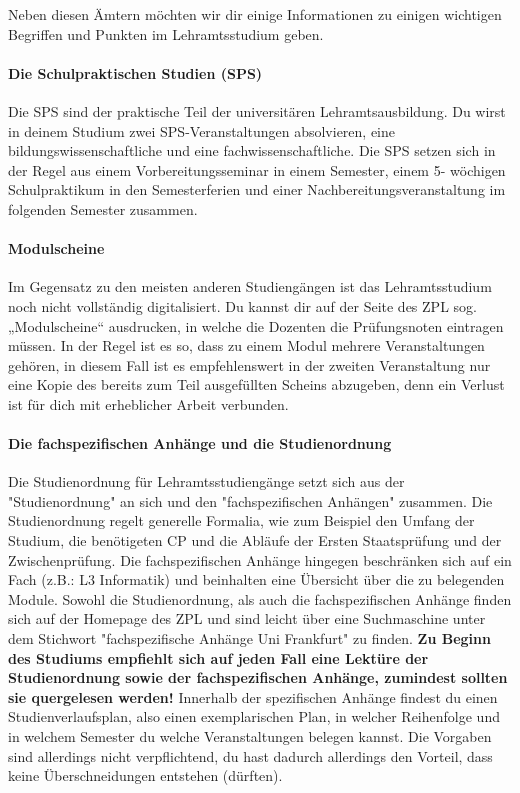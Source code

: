 Neben diesen Ämtern möchten wir dir einige Informationen zu einigen wichtigen Begriffen und Punkten im Lehramtsstudium geben.

\paragraph{Die Schulpraktischen Studien (SPS)}
Die SPS sind der praktische Teil der universitären Lehramtsausbildung. Du wirst in deinem Studium zwei SPS-Veranstaltungen absolvieren, eine bildungswissenschaftliche und eine fachwissenschaftliche. Die SPS setzen sich in der Regel aus einem Vorbereitungsseminar in einem Semester, einem 5- wöchigen Schulpraktikum in den Semesterferien und einer Nachbereitungsveranstaltung im folgenden Semester zusammen.

\paragraph{Modulscheine}
Im Gegensatz zu den meisten anderen Studiengängen ist das Lehramtsstudium noch nicht vollständig digitalisiert. Du kannst dir auf der Seite des ZPL sog. „Modulscheine“ ausdrucken, in welche die Dozenten die Prüfungsnoten eintragen müssen.
In der Regel ist es so, dass zu einem Modul mehrere Veranstaltungen gehören, in diesem Fall ist es empfehlenswert in der zweiten Veranstaltung nur eine Kopie des bereits zum Teil ausgefüllten Scheins abzugeben, denn ein Verlust ist für dich mit erheblicher Arbeit verbunden.

\paragraph{Die fachspezifischen Anhänge und die Studienordnung}
Die Studienordnung für Lehramtsstudiengänge setzt sich aus der
"Studienordnung" an sich und den "fachspezifischen Anhängen" zusammen. Die Studienordnung regelt generelle Formalia, wie zum Beispiel den Umfang der Studium, die benötigeten CP und die Abläufe der Ersten Staatsprüfung und der Zwischenprüfung.
Die fachspezifischen Anhänge hingegen beschränken sich auf ein Fach (z.B.: L3 Informatik) und beinhalten eine Übersicht über die zu belegenden Module.
Sowohl die Studienordnung, als auch die fachspezifischen Anhänge finden sich auf der Homepage des ZPL und sind leicht über eine Suchmaschine unter dem Stichwort "fachspezifische Anhänge Uni Frankfurt" zu finden.
\textbf{Zu Beginn des Studiums empfiehlt sich auf jeden Fall eine Lektüre der Studienordnung sowie der fachspezifischen Anhänge, zumindest sollten sie quergelesen werden!}
Innerhalb der spezifischen Anhänge findest du einen Studienverlaufsplan, also einen exemplarischen Plan, in welcher Reihenfolge und in welchem Semester du welche Veranstaltungen belegen kannst. Die Vorgaben sind allerdings nicht verpflichtend, du hast dadurch allerdings den Vorteil, dass keine Überschneidungen entstehen (dürften).

